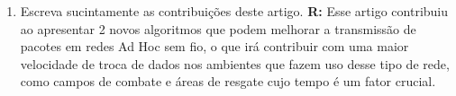 \documentclass[a4paper,11pt,fleqn]{article}
\begin{document}
\begin{enumerate}
\begin{itemize}
        \end{itemize}
    \item{Escreva sucintamente as contribuições deste artigo.}
    \newline
    \textbf{R:}
        Esse artigo contribuiu ao apresentar 2 novos algoritmos que podem
        melhorar a transmissão de pacotes em redes Ad Hoc sem fio, o que irá
        contribuir com uma maior velocidade de troca de dados nos ambientes que
        fazem uso desse tipo de rede, como campos de combate e áreas de resgate cujo
        tempo é um fator crucial.

\end{enumerate}
\end{document}
